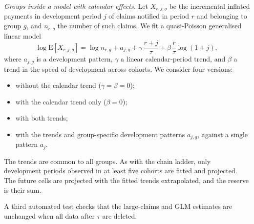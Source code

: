 \emph{Groups inside a model with calendar effects.} Let $X_{r,j,g}$ be the incremental inflated payments in development period $j$ of claims notified in period $r$ and belonging to group $g$, and $n_{r,g}$ the number of such claims. We fit a quasi-Poisson generalised linear model
\begin{equation}
\log \mathrm{E}[X_{r,j,g}] = \log n_{r,g} + a_{j,g} + \gamma\, \frac{r+j}{\tau} + \beta\, \frac{r}{\tau} \log(1+j),
\label{eq:glm}
\end{equation}
where $a_{j,g}$ is a development pattern, $\gamma$ a linear calendar-period trend, and $\beta$ a trend in the speed of development across cohorts. We consider four versions:
\begin{itemize}[leftmargin=*]
\item without the calendar trend ($\gamma = \beta = 0$);
\item with the calendar trend only ($\beta = 0$);
\item with both trends;
\item with the trends and group-specific development patterns $a_{j,g}$, against a single pattern $a_j$.
\end{itemize}
The trends are common to all groups. As with the chain ladder, only development periods observed in at least five cohorts are fitted and projected. The future cells are projected with the fitted trends extrapolated, and the reserve is their sum.

A third automated test checks that the large-claims and GLM estimates are unchanged when all data after $\tau$ are deleted.
